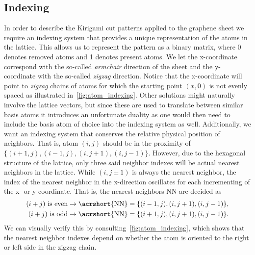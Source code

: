 \subsection{Indexing}
In order to describe the Kirigami cut patterns applied to the graphene sheet we require an indexing system that provides a unique representation of the atoms in the lattice. This allows us to represent the pattern as a binary matrix, where 0 denotes removed atoms and 1 denotes present atoms. We let the x-coordinate correspond with the so-called \textit{armchair} direction of the sheet and the y-coordinate with the so-called \textit{zigzag} direction. Notice that the x-coordinate will point to \textit{zigzag} chains of atoms for which the starting point $(x, 0)$ is not evenly spaced as illustrated in~\cref{fig:atom_indexing}. Other
solutions might naturally involve the lattice vectors, but since these are used
to translate between similar basis atoms it introduces an unfortunate duality as
one would then need to include the basis atom of choice into the indexing system
as well. Additionally, we want an indexing system that conserves the relative
physical position of neighbors. That is, atom $(i, j)$ should be in the
proximity of $\{(i+1, j), (i-1, j), (i, j+1), (i, j-1)\}$. However, due to the
hexagonal structure of the lattice, only three said neighbor indexes will be
actual nearest neighbors in the lattice. While $(i, j\pm 1)$ is always the nearest
neighbor, the index of the nearest neighbor in the x-direction oscillates for
each incrementing of the x- or y-coordinate. That is, the nearest neighbors \acrshort{NN} are decided as
\begin{equation}
  \begin{aligned}
    (i + j) \ \text{is even} &\rightarrow \text{\acrshort{NN}} = \{(i-1, j), (i, j+1), (i, j-1)\}, \\
    (i + j) \ \text{is odd} &\rightarrow \text{\acrshort{NN}} = \{(i+1, j), (i, j+1), (i, j-1)\}.
  \end{aligned}
  \label{eq:atom_neigh_idx}
\end{equation}
We can visually verify this by consulting~\cref{fig:atom_indexing}, which shows that the nearest neighbor indexes depend on whether the atom is oriented to the right or left side in the zigzag chain.

